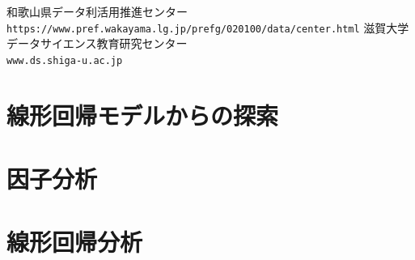 \documentclass[a4j,11pt,mc]{jreport}
\newcommand{\tb}[1]{\textcolor{blue}{#1}}  %
\begin{document}


{和歌山県データ利活用推進センター\\\texttt{https://www.pref.wakayama.lg.jp/prefg/020100/data/center.html}}
{滋賀大学データサイエンス教育研究センター\\ \texttt{www.ds.shiga-u.ac.jp}}

\tableofcontents
\thispagestyle{empty}
\newpage

%

%


\chapter{線形回帰モデルからの探索}



\chapter{因子分析}

%

\chapter{線形回帰分析}
\end{document}

